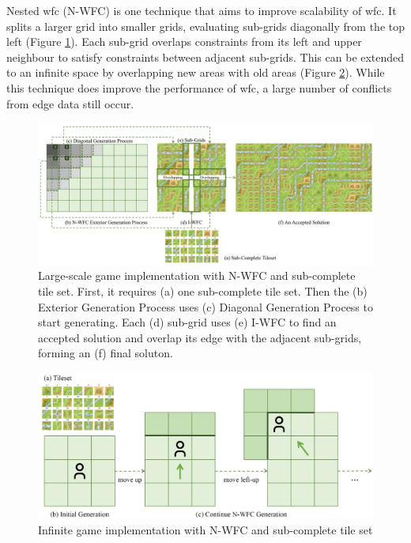 Nested \acrshort{wfc} (N-WFC) \cite{Nested_WFC} is one technique that aims to improve scalability of \acrshort{wfc}. It splits a larger grid into smaller grids, evaluating sub-grids diagonally from the top left (Figure \ref{fig:nestedWFC}). Each sub-grid overlaps constraints from its left and upper neighbour to satisfy constraints between adjacent sub-grids. This can be extended to an infinite space by overlapping new areas with old areas (Figure \ref{fig:infiniteWFC}). While this technique does improve the performance of \acrshort{wfc}, a large number of conflicts from edge data still occur.

\begin{figure}[H]
    \centering
    \includegraphics[width=\textwidth, height=0.3\textheight, keepaspectratio]{Images/NestedWFC.jpg}
    \caption{Large-scale game implementation with N-WFC and sub-complete tile set. First, it requires (a) one sub-complete tile set. Then the (b) Exterior Generation Process uses (c) Diagonal Generation Process to start generating. Each (d) sub-grid uses (e) I-WFC to find an accepted solution and overlap its edge with the adjacent sub-grids, forming an (f) final soluton. \cite{Nested_WFC}}
    \label{fig:nestedWFC}
\end{figure}

\begin{figure}[H]
    \centering
    \includegraphics[width=\textwidth, height=0.3\textheight, keepaspectratio]{Images/InfiniteWFC.jpg}
    \caption{Infinite game implementation with N-WFC and sub-complete tile set \cite{Nested_WFC}}
    \label{fig:infiniteWFC}
\end{figure}

